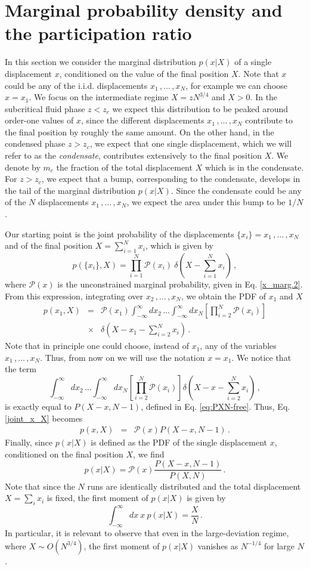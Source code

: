 \documentclass[aps,pre,twocolumn,superscriptaddress,showpacs]{revtex4-1}
\newcommand{\be}{\begin{equation}}
\newcommand{\ee}{\end{equation}}
\newcommand{\bea}{\begin{eqnarray}}
\newcommand{\eea}{\end{eqnarray}}
\newcommand{\mP}{\mathcal{P}}
\begin{document}
\section{Marginal probability density and the participation ratio}
\label{sec:marginal}

In this section we consider the marginal distribution $p(x|X)$ of a single displacement $x$, conditioned on the value of the final position $X$. Note that $x$ could be any of the i.i.d. displacements $x_1\,,\ldots\,,x_N$, for example we can choose $x=x_1$. We focus on the intermediate regime $X=z N^{3/4}$ and $X>0$. In the subcritical fluid phase $z<z_c$ we expect this distribution to be peaked around order-one values of $x$, since the different displacements $x_1\,,\ldots\,, x_N$ contribute to the final position by roughly the same amount. On the other hand, in the condensed phase $z>z_c$, we expect that one single displacement, which we will refer to as the \emph{condensate}, contributes extensively to the final position $X$. We denote by $m_c$ the fraction of the total displacement $X$ which is in the condensate. For $z>z_c$, we expect that a bump, corresponding to the condensate, develops in the tail of the marginal distribution $p(x|X)$. Since the condensate could be any of the $N$ displacements $x_1\,,\ldots\,, x_N$, we expect the area under this bump to be $1/N$. 


Our starting point is the joint probability of the displacements $\{x_i\}=x_1\,,\ldots\,,x_N$ and of the final position $X=\sum_{i=1}^{N}x_i$, which is given by
\be 
p(\{x_i\},X)=\prod_{i=1}^{N}\mP(x_i)~\delta\left(X-\sum_{i=1}^Nx_i\right)\,,
\ee
where $\mP(x)$ is the unconstrained marginal probability, given in Eq. \eqref{x_marg.2}. From this expression, integrating over $x_2\,,\ldots\,,x_N$, we obtain the PDF of $x_1$ and $X$
\bea
p(x_1,X)&=&\mP(x_1)\int_{-\infty}^{\infty}dx_2\,\ldots\int_{-\infty}^{\infty}dx_N\left[\prod_{i=2}^{N}\mP(x_i)\right]\nonumber\\
&\times &\delta\left(X-x_1-\sum_{i=2}^N x_i\right)\,.
\label{joint_x_X}
\eea
Note that in principle one could choose, instead of $x_1$, any of the variables $x_1\,,\ldots\,,x_N$. Thus, from now on we will use the notation $x=x_1$. We notice that the term
\be
\int_{-\infty}^{\infty}dx_2\,\ldots\int_{-\infty}^{\infty}dx_N\left[\prod_{i=2}^{N}\mP(x_i)\right]\delta\left(X-x-\sum_{i=2}^N x_i\right)\,,
\ee
is exactly equal to $P(X-x,N-1)$, defined in Eq. \eqref{eq:PXN-free}. Thus, Eq. \eqref{joint_x_X} becomes
\bea
p(x,X)&=&\mP(x)P(X-x,N-1)\,.
\label{joint_x_X2}
\eea
Finally, since $p(x|X)$ is defined as the PDF of the single displacement $x$, conditioned on the final position $X$, we find 
\be
p(x|X)=\mP(x)\frac{P(X-x,N-1)}{P(X,N)}\,.
\label{marg_x|X}
\ee
Note that since the $N$ runs are identically distributed and the total displacement $X=\sum_{i}x_i$ is fixed, the first moment of $p(x|X)$ is given by
\begin{equation}
\int_{-\infty}^{\infty}dx~x~p(x|X)=\frac{X}{N}\,.
\label{first_moment}
\end{equation}
In particular, it is relevant to observe that even in the large-deviation regime, where $X\sim O(N^{3/4})$, the first moment of $p(x|X)$ vanishes as $N^{-1/4}$ for large $N$.
\end{document}
